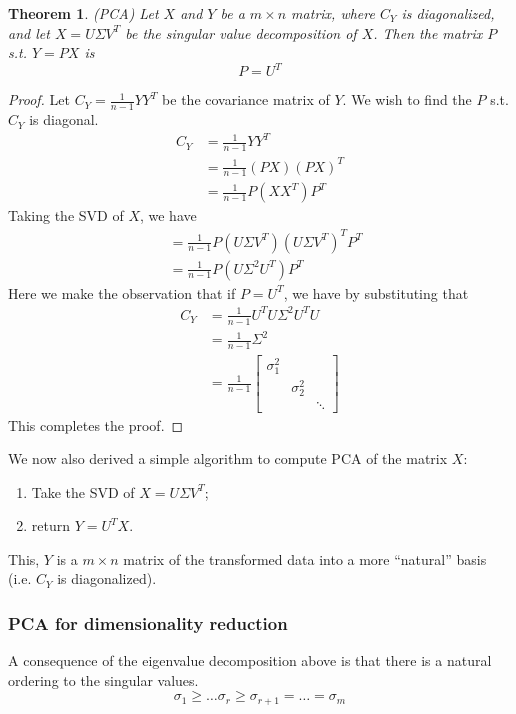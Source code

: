 \documentclass[11pt]{article}
\newtheorem{theorem}{Theorem}[section]
\begin{document}
\begin{multicols}{2}
\begin{theorem}
\emph{(PCA)}
\label{PCA}
Let $X$ and $Y$ be a $m \times n$ matrix, where $C_Y$ is diagonalized, and let $X = U \Sigma V^T$ be the singular value decomposition of $X$. Then the matrix $P$ s.t. $Y = PX$ is
\[P = U^T\]
\end{theorem}
\begin{proof}
Let $C_Y = \frac{1}{n-1}YY^T$ be the covariance matrix of $Y$. We wish to find the $P$ s.t. $C_Y$ is diagonal.
\begin{align*}
C_Y &= \frac{1}{n-1}YY^T \\
&= \frac{1}{n-1} (PX)(PX)^T \\
&= \frac{1}{n-1} P(XX^T)P^T
\end{align*}
Taking the SVD of $X$, we have
\begin{align*}
&= \frac{1}{n-1} P(U \Sigma V^T)(U \Sigma V^T)^TP^T \\
&= \frac{1}{n-1} P (U \Sigma^2 U^T) P^T
\end{align*}
Here we make the observation that if $P = U^T$, we have by substituting that
\begin{align*}
C_Y &= \frac{1}{n-1} U^TU \Sigma^2 U^TU \\
&= \frac{1}{n-1} \Sigma^2 \\
&= \frac{1}{n-1} \begin{bmatrix} \sigma_1^2 & & \\ & \sigma_2^2 & \\ & & \ddots \end{bmatrix}
\end{align*}
This completes the proof.
\end{proof}

We now also derived a simple algorithm to compute PCA of the matrix $X$:
\begin{enumerate}
\item Take the SVD of $X = U \Sigma V^T$;
\item return $Y = U^TX$.
\end{enumerate}
This, $Y$ is a $m \times n$ matrix of the transformed data into a more ``natural'' basis (i.e. $C_Y$ is diagonalized).

\subsubsection*{PCA for dimensionality reduction}
A consequence of the eigenvalue decomposition above is that there is a natural ordering to the singular values.
\[\sigma_1 \ge \ldots \sigma_r \ge \sigma_{r+1} = \ldots = \sigma_{m}\]


\end{multicols}
\end{document}
